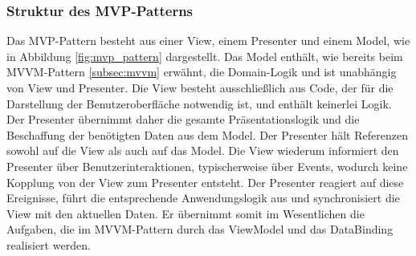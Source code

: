 \subsubsection{Struktur des MVP-Patterns}
Das MVP-Pattern besteht aus einer View, einem Presenter und einem Model, wie in Abbildung \ref{fig:mvp_pattern} dargestellt. 
Das Model enthält, wie bereits beim MVVM-Pattern \ref{subsec:mvvm} erwähnt, die Domain-Logik und ist unabhängig von View und Presenter. 
Die View besteht ausschließlich aus Code, der für die Darstellung der Benutzeroberfläche notwendig ist, und enthält keinerlei Logik. 
Der Presenter übernimmt daher die gesamte Präsentationslogik und die Beschaffung der benötigten Daten aus dem Model. Der Presenter hält Referenzen sowohl auf die View als auch auf das Model. Die View wiederum informiert den Presenter über Benutzerinteraktionen, typischerweise über Events, wodurch keine Kopplung von der View zum Presenter entsteht. Der Presenter reagiert auf diese Ereignisse, führt die entsprechende Anwendungslogik aus und synchronisiert die View mit den aktuellen Daten. Er übernimmt somit im Wesentlichen die Aufgaben, die im MVVM-Pattern durch das ViewModel und das DataBinding realisiert werden.











